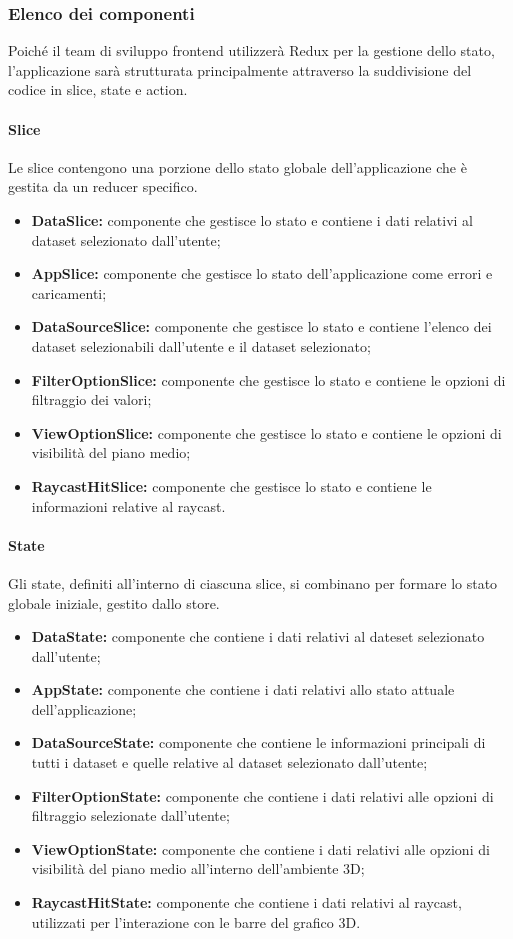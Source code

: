 \subsubsection{Elenco dei componenti}
Poiché il team di sviluppo frontend utilizzerà Redux per la gestione dello
stato, l'applicazione sarà strutturata principalmente attraverso la
suddivisione del codice in slice, state e action.
\paragraph{Slice}
Le slice contengono una porzione dello stato globale dell'applicazione che è
gestita da un reducer specifico.
\begin{itemize}
      \item \textbf{DataSlice:} componente che gestisce lo stato e contiene i dati relativi al dataset selezionato dall'utente;
      \item \textbf{AppSlice:} componente che gestisce lo stato dell'applicazione come errori e caricamenti;
      \item \textbf{DataSourceSlice:} componente che gestisce lo stato e contiene l'elenco dei dataset selezionabili dall'utente e il dataset selezionato;
      \item \textbf{FilterOptionSlice:} componente che gestisce lo stato e contiene le opzioni di filtraggio dei valori;
      \item \textbf{ViewOptionSlice:} componente che gestisce lo stato e contiene le opzioni di visibilità del piano medio;
      \item \textbf{RaycastHitSlice:} componente che gestisce lo stato e contiene le informazioni relative al raycast.
\end{itemize}
\paragraph{State}
Gli state, definiti all'interno di ciascuna slice, si combinano per formare lo
stato globale iniziale, gestito dallo store.
\begin{itemize}
      \item \textbf{DataState:} componente che contiene i dati relativi al dateset selezionato dall'utente;
      \item \textbf{AppState:} componente che contiene i dati relativi allo stato attuale dell'applicazione;
      \item \textbf{DataSourceState:} componente che contiene le informazioni principali di tutti i dataset e quelle relative al dataset selezionato dall'utente;
      \item \textbf{FilterOptionState:} componente che contiene i dati relativi alle opzioni di filtraggio selezionate dall'utente;
      \item \textbf{ViewOptionState:} componente che contiene i dati relativi alle opzioni di visibilità del piano medio all'interno dell'ambiente 3D;
      \item \textbf{RaycastHitState:} componente che contiene i dati relativi al raycast, utilizzati per l'interazione con le barre del grafico 3D.
\end{itemize}
